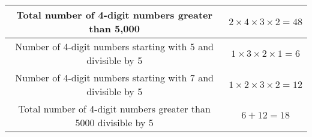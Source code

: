 

\providecommand{\pr}[1]{\ensuremath{\Pr\left(#1\right)}}


\begin{center}
\large \begin{tabular}{|c|c|}
\hline

Total number of 4-digit numbers greater than 5,000 & $2 \times 4 \times 3 \times 2 = 48$ \\
\hline
Number of 4-digit numbers starting with 5 and divisible by 5 & $1 \times 3 \times 2 \times 1 = 6$ \\
\hline
Number of 4-digit numbers starting with 7 and divisible by 5 & $1 \times 2 \times 3 \times 2 = 12$ \\
\hline
Total number of 4-digit numbers greater than 5000 divisible by 5 & $6 + 12 = 18$ \\ 
\hline
 \end{tabular} 
 \end{center}



